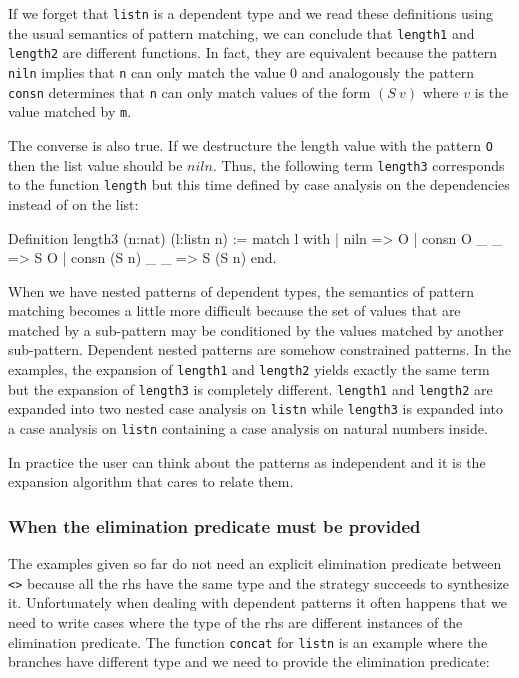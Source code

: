 If we forget that \verb+listn+ is a dependent type and we read these
definitions using the usual semantics of pattern matching,  we can conclude
that \verb+length1+
and \verb+length2+ are different functions.
In fact, they are equivalent
because the pattern \verb+niln+ implies that \verb+n+ can only match
the value $0$ and analogously the pattern \verb+consn+ determines that \verb+n+ can
only match  values of the form  $(S~v)$ where $v$ is the value matched by
\verb+m+. 


The converse is also true. If
we destructure the  length  value with the pattern \verb+O+ then the list
value should be $niln$. 
Thus, the following term \verb+length3+ corresponds to the function
\verb+length+ but this time defined by case analysis on the dependencies instead of on the list:

\begin{coq_example}
Definition length3 (n:nat) (l:listn n) :=
  match l with
  | niln => O
  | consn O _ _ => S O
  | consn (S n) _ _ => S (S n)
  end.
\end{coq_example}

When we have nested patterns of dependent types, the semantics of
pattern matching becomes a little more difficult because
the set of values that are matched by a sub-pattern may be conditioned by the
values matched by another sub-pattern. Dependent nested patterns are
somehow constrained patterns. 
In the examples, the expansion of
\verb+length1+ and \verb+length2+ yields exactly the same term
 but the
expansion of \verb+length3+ is completely different. \verb+length1+ and
\verb+length2+ are expanded into two nested case analysis on
\verb+listn+ while \verb+length3+ is expanded into a case analysis on
\verb+listn+ containing a case analysis on natural numbers inside.


In practice the user can think about the patterns as independent and
it is the expansion algorithm that cares to relate them. \\


\subsubsection{When the elimination predicate must be provided}
The examples  given so far do not need an explicit elimination predicate
between \verb+<>+ because all the rhs have the same type and the
strategy succeeds to synthesize it.
Unfortunately when dealing with dependent patterns it often happens
that we need to write cases where the type of the rhs are 
different  instances of the elimination  predicate.
The function  \verb+concat+ for \verb+listn+
is an example where the branches have different type
and we need to provide the elimination predicate:

